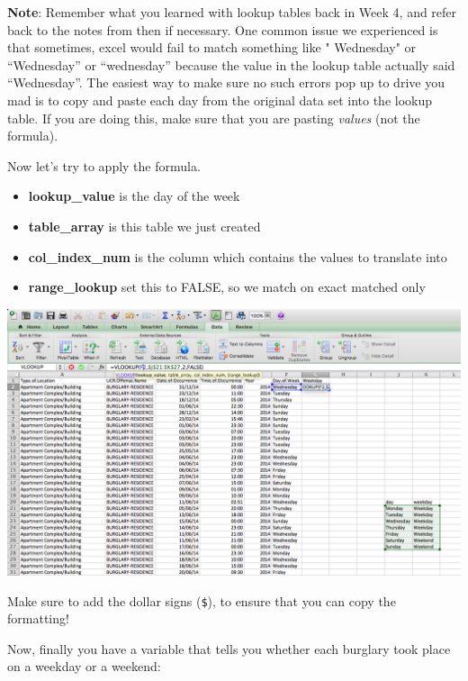 \documentclass[
]{book}
\providecommand{\tightlist}{%
  \setlength{\itemsep}{0pt}\setlength{\parskip}{0pt}}
\begin{document}
\textbf{Note}: Remember what you learned with lookup tables back in Week 4, and refer back to the notes from then if necessary. One common issue we experienced is that sometimes, excel would fail to match something like " Wednesday" or ``Wednesday'' or ``wednesday'' because the value in the lookup table actually said ``Wednesday''. The easiest way to make sure no such errors pop up to drive you mad is to copy and paste each day from the original data set into the lookup table. If you are doing this, make sure that you are pasting \emph{values} (not the formula).

Now let's try to apply the formula.

\begin{itemize}
\tightlist
\item
  \textbf{lookup\_value} is the day of the week
\item
  \textbf{table\_array} is this table we just created
\item
  \textbf{col\_index\_num} is the column which contains the values to translate into
\item
  \textbf{range\_lookup} set this to FALSE, so we match on exact matched only
\end{itemize}

\includegraphics{imgs/vlookup_formula_wkday.png}

Make sure to add the dollar signs (\texttt{\$}), to ensure that you can copy the formatting!

Now, finally you have a variable that tells you whether each burglary took place on a weekday or a weekend:
\end{document}
